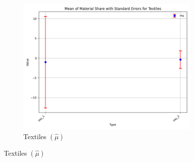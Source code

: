 \documentclass{article}
\begin{document}
\begin{figure}[ht!]
\begin{subfigure}[t]{0.32\textwidth}
        \centering
        \includegraphics[width=\textwidth]{figure/empirical_ar1_normal_kmshare_ciiu_mu_with_error_bars_Textiles.png}
        \caption{Textiles $(\hat\mu)$}
    \end{subfigure}



\end{figure}
\end{document}
